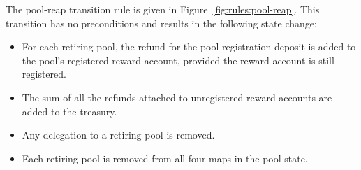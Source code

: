 The pool-reap transition rule is given in Figure~\ref{fig:rules:pool-reap}.
This transition has no preconditions and results in the following state change:

\begin{itemize}
  \item For each retiring pool, the refund for the pool registration deposit is added to the
    pool's registered reward account, provided the reward account is still registered.
  \item The sum of all the refunds attached to unregistered reward accounts are added to the
    treasury.
  \item Any delegation to a retiring pool is removed.
  \item Each retiring pool is removed from all four maps in the pool state.
\end{itemize}

